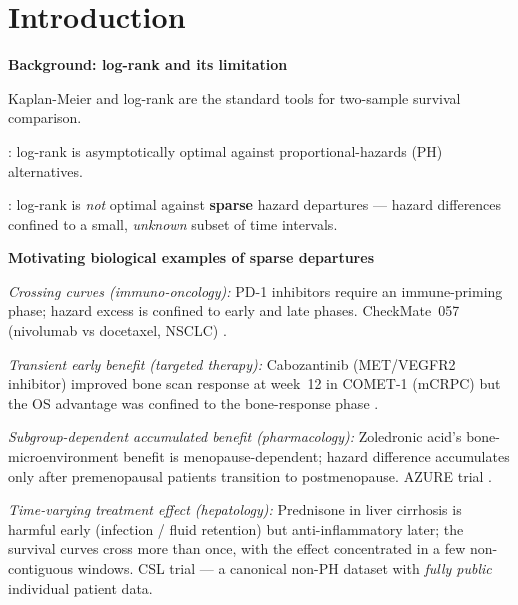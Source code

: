 \documentclass[unnumsec,webpdf,contemporary,large]{oup-authoring-template}
\let\origitemize\itemize
\let\origenditemize\enditemize
\renewenvironment{itemize}{%
  \origitemize
  \setlength{\itemsep}{1pt}%
  \setlength{\parskip}{0pt}%
  \setlength{\topsep}{3pt}%
}{\origenditemize}
\begin{document}
\section{Introduction}

\textbf{Background: log-rank and its limitation}
\begin{itemize}
  \item Kaplan-Meier \citep{kaplan1958} and log-rank \citep{mantel1966}
        are the standard tools for two-sample survival comparison.
  \item \citet{schoenfeld1981}: log-rank is asymptotically optimal
        against proportional-hazards (PH) alternatives.
  \item \citet{kipnis_biometrika}: log-rank is \emph{not} optimal
        against \textbf{sparse} hazard departures — hazard differences
        confined to a small, \emph{unknown} subset of time intervals.
\end{itemize}

\textbf{Motivating biological examples of sparse departures}
\begin{itemize}
  \item \textit{Crossing curves (immuno-oncology):} PD-1 inhibitors
        require an immune-priming phase; hazard excess is confined to
        early and late phases. CheckMate~057 (nivolumab vs docetaxel,
        NSCLC) \citep{borghaei2015}.
  \item \textit{Transient early benefit (targeted therapy):} Cabozantinib
        (MET/VEGFR2 inhibitor) improved bone scan response at week~12 in
        COMET-1 (mCRPC) but the OS advantage was confined to the
        bone-response phase \citep{smith2016}.
  \item \textit{Subgroup-dependent accumulated benefit (pharmacology):}
        Zoledronic acid's bone-microenvironment benefit is
        menopause-dependent; hazard difference accumulates only after
        premenopausal patients transition to postmenopause.
        AZURE trial \citep{coleman2011}.
  \item \textit{Time-varying treatment effect (hepatology):} Prednisone
        in liver cirrhosis is harmful early (infection / fluid retention)
        but anti-inflammatory later; the survival curves cross more than
        once, with the effect concentrated in a few non-contiguous windows.
        CSL trial \citep{csl_data} --- a canonical non-PH dataset with
        \emph{fully public} individual patient data.
\end{itemize}
\end{document}
